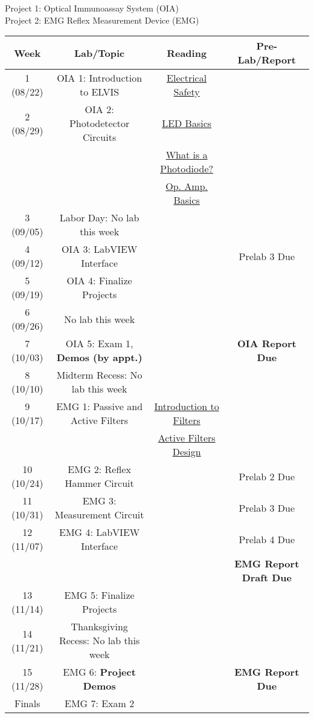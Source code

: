\documentclass{article}
\begin{document}
{\color{red} Project 1: Optical Immunoassay System (OIA)}\\

{\color{blue} Project 2: EMG Reflex Measurement Device (EMG)}\\

\begin{table}[h!]
	\centering
\begin{tabular}[h!]{cccc}
\toprule
	Week & Lab/Topic & Reading & Pre-Lab/Report\\
	\midrule
	1 (08/22) & {\color{red} OIA 1: Introduction to ELVIS} & \href{https://www.electronicshub.org/electrical-safety/}{Electrical Safety} & \\
	2 (08/29) & {\color{red} OIA 2: Photodetector Circuits} & \href{https://www.electronicshub.org/light-emitting-diode-basics/}{LED Basics} & \\
		& & \href{https://www.electronicshub.org/photodiode-working-characteristics-applications/}{What is a Photodiode?} & \\
		& & \href{https://www.electronicshub.org/operational-amplifier-basics/}{Op. Amp. Basics} &\\
	\midrule
	3 (09/05) & Labor Day: No lab this week & &\\
	\midrule
	4 (09/12) & {\color{red} OIA 3: LabVIEW Interface} & & {\color{red} Prelab 3 Due}\\
	5 (09/19) & {\color{red} OIA 4: Finalize Projects} & &\\
	6 (09/26) & No lab this week & & \\
	7 (10/03) & {\color{red} OIA 5: Exam 1, \textbf{Demos (by appt.)}} & & {\color{red} \textbf{OIA Report Due}}\\
	\midrule
	8 (10/10) & Midterm Recess: No lab this week & &\\
	\midrule
	9 (10/17) & {\color{blue} EMG 1: Passive and Active Filters} & \href{https://www.electronicshub.org/introduction-to-filters-and-capacitive-reactance/}{Introduction to Filters} & \\
		& & \href{https://www.electronicshub.org/active-filters-design/}{Active Filters Design} & \\
	10 (10/24) & {\color{blue} EMG 2: Reflex Hammer Circuit} & & {\color{blue} Prelab 2 Due}\\
	11 (10/31) & {\color{blue} EMG 3: Measurement Circuit} & & {\color{blue} Prelab 3 Due}\\
	12 (11/07) & {\color{blue} EMG 4: LabVIEW Interface} & & {\color{blue} Prelab 4 Due}\\
	& & & {\color{blue} \textbf{EMG Report Draft Due}}\\
	13 (11/14) & {\color{blue} EMG 5: Finalize Projects} & & \\
	\midrule
	14 (11/21) & Thanksgiving Recess: No lab this week & & \\
	\midrule
	15 (11/28) & {\color{blue} EMG 6: \textbf{Project Demos}} & & {\color{blue} \textbf{EMG Report Due}}\\
	Finals & {\color{blue} EMG 7: Exam 2} & &\\
	\bottomrule
\end{tabular}
\end{table}
\end{document}
